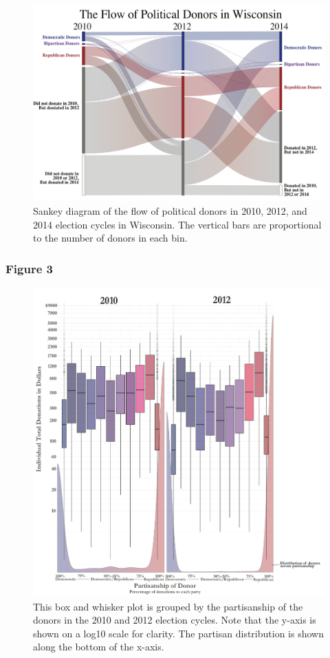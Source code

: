 \documentclass[12pt,]{article}
\begin{document}
\begin{figure}
\includegraphics[width=1\linewidth]{../figures/fig2} \caption{Sankey diagram of the flow of political donors in 2010, 2012, and 2014 election cycles in Wisconsin. The vertical bars are proportional to the number of donors in each bin.}\label{fig:unnamed-chunk-12}
\end{figure}

\newpage

\hypertarget{figure-3}{%
\subsubsection{Figure 3}\label{figure-3}}

\begin{figure}
\includegraphics[width=0.9\linewidth]{../figures/fig4} \caption{This box and whisker plot is grouped by the partisanship of the donors in the 2010 and 2012 election cycles. Note that the y-axis is shown on a log10 scale for clarity. The partisan distribution is shown along the bottom of the x-axis.}\label{fig:unnamed-chunk-13}
\end{figure}
\end{document}
